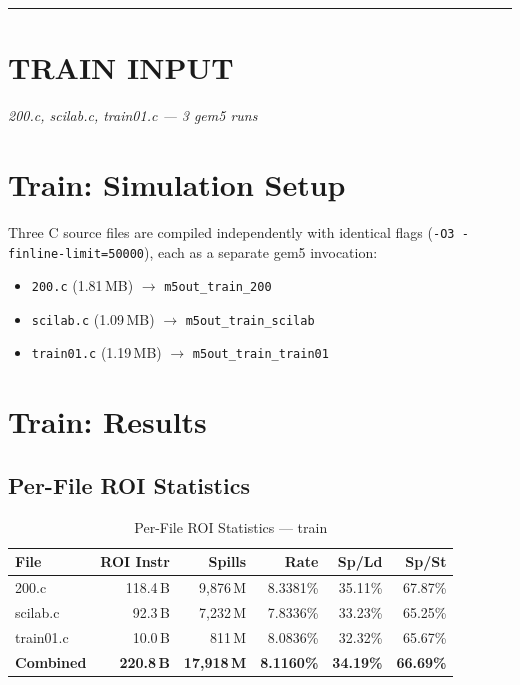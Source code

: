 \documentclass[conference]{IEEEtran}
\newcommand{\inputpart}[2]{%
    \vspace{1em}
    \noindent\rule{\linewidth}{0.4pt}
    \section{#1}
    \textit{#2}
    \vspace{0.2em}
}
\begin{document}
\inputpart{TRAIN INPUT}{200.c, scilab.c, train01.c --- 3 gem5 runs}

\section{Train: Simulation Setup}

Three C source files are compiled independently with identical flags
(\texttt{-O3 -finline-limit=50000}), each as a separate gem5
invocation:

\begin{itemize}
    \item \texttt{200.c} (1.81\,MB) $\rightarrow$ \texttt{m5out\_train\_200}
    \item \texttt{scilab.c} (1.09\,MB) $\rightarrow$ \texttt{m5out\_train\_scilab}
    \item \texttt{train01.c} (1.19\,MB) $\rightarrow$ \texttt{m5out\_train\_train01}
\end{itemize}

\section{Train: Results}

\subsection{Per-File ROI Statistics}

\begin{table}[H]
\centering
\caption{Per-File ROI Statistics --- train}
\label{tab:train_perfile}
\begin{tabular}{lrrrrr}
\toprule
\textbf{File} & \textbf{ROI Instr} & \textbf{Spills} & \textbf{Rate}
    & \textbf{Sp/Ld} & \textbf{Sp/St} \\
\midrule
200.c     & 118.4\,B & 9,876\,M & 8.3381\% & 35.11\% & 67.87\% \\
scilab.c  &  92.3\,B & 7,232\,M & 7.8336\% & 33.23\% & 65.25\% \\
train01.c &  10.0\,B &   811\,M & 8.0836\% & 32.32\% & 65.67\% \\
\midrule
\textbf{Combined} & \textbf{220.8\,B} & \textbf{17,918\,M}
    & \textbf{8.1160\%} & \textbf{34.19\%} & \textbf{66.69\%} \\
\bottomrule
\end{tabular}
\end{table}
\end{document}
